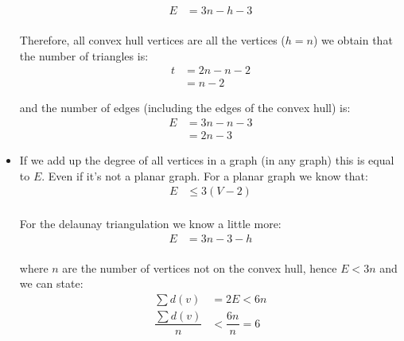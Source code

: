 \documentclass[12pt]{article}
\begin{document}
\begin{itemize}
	\begin{equation}
		\begin{aligned}
			E &= 3n - h - 3 \\
		\end{aligned}
	\end{equation}
	
	Therefore, all convex hull vertices are all the vertices ($h=n$) we obtain that the number of triangles is:
	\begin{equation}
		\begin{aligned}
			t &= 2n - n - 2 \\
			&= n-2
		\end{aligned}
	\end{equation}
	
	and the number of edges (including the edges of the convex hull) is:
	\begin{equation}
		\begin{aligned} \label{eq:4}
			E &= 3n - n - 3 \\
			&= 2n - 3
		\end{aligned}
	\end{equation}
	
	\item If we add up the degree of all vertices in a graph (in any graph) this is equal to $E$. Even if it's not a planar graph. For a planar graph we know that:
	\begin{equation}
		\begin{aligned}
			E & \leq 3(V-2) \\
		\end{aligned}
	\end{equation}
	
	For the delaunay triangulation we know a little more:
	\begin{equation}
		\begin{aligned}
			E &= 3n - 3 - h \\
		\end{aligned}
	\end{equation}
	
	where $n$ are the number of vertices not on the convex hull, hence $E < 3n$ and we can state:
	\begin{equation}
		\begin{aligned}
			\sum d(v) &= 2E < 6n \\
			\dfrac{ \sum d(v) } {n} &< \dfrac{6n}{n} = 6
		\end{aligned}
	\end{equation}
	

\end{itemize}
\end{document}
